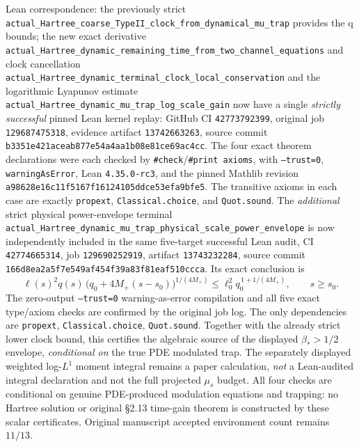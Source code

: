 \documentclass[11pt]{amsart}
\begin{document}
Lean correspondence: the previously strict
\texttt{actual\_Hartree\_coarse\_TypeII\_clock\_from\_dynamical\_mu\_trap}
provides the q bounds; the new exact derivative
\texttt{actual\_Hartree\_dynamic\_remaining\_time\_from\_two\_channel\_equations}
and clock cancellation
\texttt{actual\_Hartree\_dynamic\_terminal\_clock\_local\_conservation}
and the logarithmic Lyapunov estimate
\texttt{actual\_Hartree\_dynamic\_mu\_trap\_log\_scale\_gain}
now have a single \emph{strictly successful} pinned Lean kernel replay:
GitHub CI \texttt{42773792399}, original job \texttt{129687475318},
evidence artifact \texttt{13742663263}, source commit
\texttt{b3351e421aceab877e54a4aa1b08e81ce69ac4cc}.
The four exact theorem declarations were each checked by
\texttt{\#check}/\texttt{\#print axioms}, with \texttt{--trust=0},
\texttt{warningAsError}, Lean \texttt{4.35.0-rc3}, and the pinned
Mathlib revision \texttt{a98628e16c11f5167f16124105ddce53efa9bfe5}.
The transitive axioms in each case are exactly
\texttt{propext}, \texttt{Classical.choice}, and \texttt{Quot.sound}.
The \emph{additional} strict physical power-envelope terminal
\texttt{actual\_Hartree\_dynamic\_mu\_trap\_physical\_scale\_power\_envelope}
is now independently included in the same five-target successful
Lean audit, CI \texttt{42774665314}, job \texttt{129690252919},
artifact \texttt{13743232284}, source commit
\texttt{166d8ea2a5f7e549af454f39a83f81eaf510ccca}.
Its exact conclusion is
\[
\ell(s)^2q(s)\,
  \bigl(q_0+4M_+(s-s_0)\bigr)^{1/(4M_+)}
\le\ell_0^2q_0^{\,1+1/(4M_+)},
\qquad s\ge s_0.
\]
The zero-output \texttt{--trust=0} warning-as-error
compilation and all five exact type/axiom checks are confirmed
by the original job log. The only dependencies are
\texttt{propext}, \texttt{Classical.choice}, \texttt{Quot.sound}.
Together with the already strict lower clock bound, this
certifies the algebraic source of the displayed
\(\beta_*>1/2\) envelope, \emph{conditional on} the
true PDE modulated trap. The separately displayed
weighted log-\(L^1\) moment integral remains a
paper calculation, \emph{not} a Lean-audited integral
declaration and not the full projected \(\mu_s\) budget.
All four checks are conditional on genuine PDE-produced modulation
equations and trapping: no Hartree solution or original §2.13
time-gain theorem is constructed by these scalar certificates.
Original manuscript accepted environment count remains \(11/13\).
\end{document}
